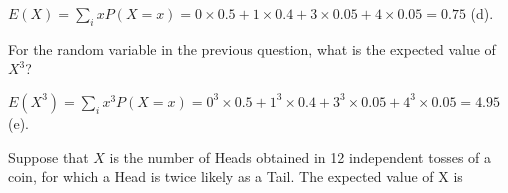 \documentclass[bigtut]{tutorial}
\begin{document}
\begin{tutorial}
\begin{questions}

\begin{solution}
$E(X) = \sum_{i} x P(X=x) = 0 \times 0.5 + 1 \times 0.4 + 3 \times 0.05 + 4 \times 0.05 = 0.75$ (d).
\end{solution}



\question
For the random variable in the previous question, what is the expected value of $X^3$? 

\begin{solution}
$E(X^3) = \sum_{i} x^3 P(X=x) = 0^3 \times 0.5 + 1^3 \times 0.4 + 3^3 \times 0.05 + 4^3 \times 0.05 = 4.95$ (e).
\end{solution}

\question
Suppose that $X$ is the number of Heads obtained in 12 independent tosses of a coin, for which a Head is twice likely as a Tail. The expected value of X is

\end{questions}
\end{tutorial}
\end{document}

